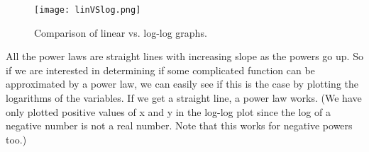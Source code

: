 \begin{figure}[ht]
	\centering
	\texttt{[image: linVSlog.png]}
	\caption{Comparison of linear vs. log-log graphs.}
	\label{fig:lin-log}
\end{figure}

\newpage

All the power laws are straight lines with increasing slope as the powers go up.
So if we are interested in determining if some complicated function can be approximated by a power law, we can easily see if this is the case by plotting the logarithms of the variables. 
If we get a straight line, a power law works. 
(We have only plotted positive values of x and y in the log-log plot since the log of a negative number is not a real number.
Note that this works for negative powers too.) 

